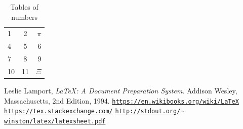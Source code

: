 \documentclass[11pt]{article}
\begin{document}
\begin{table}[htbp]
\caption{Tables of numbers}
\begin{center}
\begin{tabular}{ l | c || r } %
  \hline                       
  1 & 2 &$ \pi$ \\
  4 & 5 & 6 \\
  7 & 8 & 9 \\  
  10&11&$\Xi$\\ \hline  
\end{tabular}
\end{center}
\label{tab:myinfo} 
\end{table}

\begin{thebibliography}{99}

  Leslie Lamport,  \emph{\LaTeX: A Document Preparation System}.  Addison Wesley, Massachusetts,  2nd Edition,  1994.
 \href{https://en.wikibooks.org/wiki/LaTeX}{\texttt{https://en.wikibooks.org/wiki/LaTeX}}
 \href{https://tex.stackexchange.com/}{\texttt{https://tex.stackexchange.com/}}
 \href{http://stdout.org/~winston/latex/latexsheet.pdf}{\texttt{http://stdout.org/$\sim$winston/latex/latexsheet.pdf}}

\end{thebibliography}

\end{document}
